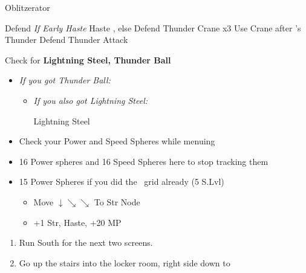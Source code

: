 \begin{battle}[3000]{Oblitzerator}
    \begin{itemize}
        \kimahrif Defend
        \tidusf \textit{If Early Haste} Haste \lulu, else Defend
        \luluf Thunder Crane x3
        \tidusf Use Crane after \lulu's  Thunder
        \kimahrif Defend
        \luluf Thunder
        \tidusf Attack
    \end{itemize}
    Check for \textbf{Lightning Steel, Thunder Ball}
\end{battle}
\begin{equip}
    \begin{itemize}
        \item \textit{If you got Thunder Ball:}
        \begin{itemize}
            \wakkaf Thunder Ball
            \item \textit{If you also got Lightning Steel:}
            \begin{itemize}
                \tidusf Lightning Steel
            \end{itemize}
        \end{itemize}
    \end{itemize}
\end{equip}
\begin{spheregrid}
    \begin{itemize}
        \item Check your Power and Speed Spheres while menuing
        \item 16 Power spheres and 16 Speed Spheres here to stop tracking them
        \item 15 Power Spheres if you did the \wakka\ grid already
        \tidusf (5 S.Lvl)
        \begin{itemize}
            \item Move $\downarrow \searrow\searrow$ To Str Node
            \item +1 Str, Haste, +20 MP
        \end{itemize}
    \end{itemize}
\end{spheregrid}
\begin{enumerate}[resume]
    \item Run South for the next two screens. \save
    \item Go up the stairs into the locker room, right side down to \wakka
\end{enumerate}
